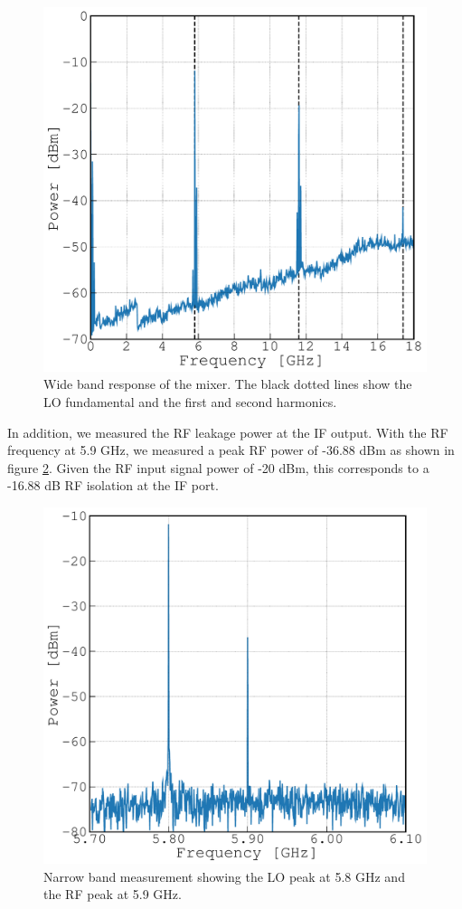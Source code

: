 \documentclass[twocolumn, aps, floatfix]{revtex4-1}
\begin{document}
\begin{figure}[!htbp]
    \includegraphics[scale=0.35]{DC_to_18GHz.pdf}
    \caption{Wide band response of the mixer. The black dotted lines show the LO fundamental and the first and second harmonics.}
    \label{fig:wideband}
\end{figure}

In addition, we measured the RF leakage power at the IF output. With the RF frequency at 5.9 GHz, we measured a peak RF power of -36.88 dBm as shown in figure \ref{fig:RFleakage}. Given the RF input signal power of -20 dBm, this corresponds to a -16.88 dB RF isolation at the IF port. 

\begin{figure}[!htbp]
    \includegraphics[scale=0.35]{RF_leakage.pdf}
    \caption{Narrow band measurement showing the LO peak at 5.8 GHz and the RF peak at 5.9 GHz.}
    \label{fig:RFleakage}
\end{figure}
\end{document}
